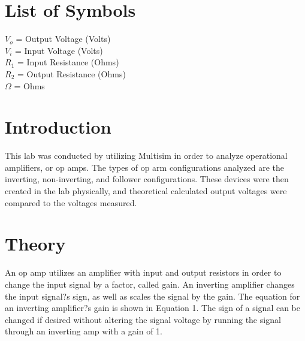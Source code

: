 \documentclass[12pt]{article}
\begin{document}

\tableofcontents

\listoffigures

\bigskip


\section*{\fontsize{12}{12}\selectfont \large List of Symbols}
$V_{o}$ = Output Voltage (Volts)\\
$V_{i}$ = Input Voltage (Volts)\\
$R_{1}$ = Input Resistance (Ohms)\\
$R_{2}$ = Output Resistance (Ohms)\\
$\Omega$ = Ohms

\newpage



\section*{\fontsize{12}{12}\selectfont \large Introduction}
This lab was conducted by utilizing Multisim in order to analyze operational amplifiers, or op amps. The types of op arm configurations analyzed are the inverting, non-inverting, and follower configurations. These devices were then created in the lab physically, and theoretical calculated output voltages were compared to the voltages measured.


\section*{\fontsize{12}{12}\selectfont \large Theory}
An op amp utilizes an amplifier with input and output resistors in order to change the input signal by a factor, called gain. An inverting amplifier changes the input signal?s sign, as well as scales the signal by the gain. The equation for an inverting amplifier?s gain is shown in Equation 1. The sign of a signal can be changed if desired without altering the signal voltage by running the signal through an inverting amp with a gain of 1.
\bigskip
\end{document}

